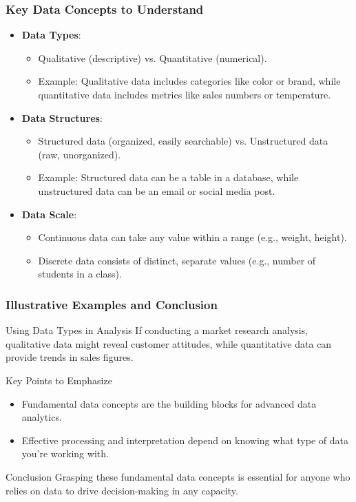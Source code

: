 \documentclass[aspectratio=169]{beamer}
\begin{document}
\begin{frame}[fragile]
    \frametitle{Key Data Concepts to Understand}
    \begin{itemize}
        \item \textbf{Data Types}:
            \begin{itemize}
                \item Qualitative (descriptive) vs. Quantitative (numerical).
                \item Example: Qualitative data includes categories like color or brand, while quantitative data includes metrics like sales numbers or temperature.
            \end{itemize}

        \item \textbf{Data Structures}:
            \begin{itemize}
                \item Structured data (organized, easily searchable) vs. Unstructured data (raw, unorganized).
                \item Example: Structured data can be a table in a database, while unstructured data can be an email or social media post.
            \end{itemize}

        \item \textbf{Data Scale}:
            \begin{itemize}
                \item Continuous data can take any value within a range (e.g., weight, height).
                \item Discrete data consists of distinct, separate values (e.g., number of students in a class).
            \end{itemize}
    \end{itemize}
\end{frame}

\begin{frame}[fragile]
    \frametitle{Illustrative Examples and Conclusion}
    \begin{block}{Using Data Types in Analysis}
        If conducting a market research analysis, qualitative data might reveal customer attitudes, while quantitative data can provide trends in sales figures.
    \end{block}

    \begin{block}{Key Points to Emphasize}
        \begin{itemize}
            \item Fundamental data concepts are the building blocks for advanced data analytics.
            \item Effective processing and interpretation depend on knowing what type of data you’re working with.
        \end{itemize}
    \end{block}

    \begin{block}{Conclusion}
        Grasping these fundamental data concepts is essential for anyone who relies on data to drive decision-making in any capacity.
    \end{block}
\end{frame}
\end{document}
